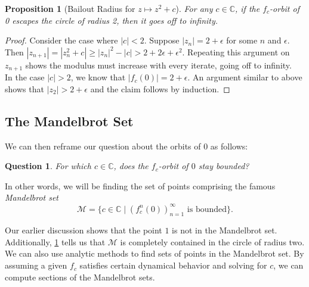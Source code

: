 \documentclass{amsart}
\newcommand{\bbC}{\mathbb{C}}
\newcommand{\cal}[1]{ \mathcal{#1}}
\newcommand{\Mand}{\cal{M}}
\newcommand{\abs}[1]{ \left| #1 \right| }
\newtheorem{prop}[thm]{Proposition}
\newtheorem{quest}[thm]{Question}
\theoremstyle{definition}
\theoremstyle{remark}
\numberwithin{equation}{section}
\begin{document}
\begin{prop}[Bailout Radius for $z\mapsto z^2+c$]\label{Mescape}
  For any $c\in\bbC$, if the $f_c$-orbit of 0 escapes the circle of radius 2, then it goes off to infinity.
\end{prop}
\begin{proof}
Consider the case where $\abs{c}<2$. Suppose $\abs{z_n}=2+\epsilon$ for some $n$ and $\epsilon$. Then $\abs{z_{n+1}}= \abs{z_n^2+c}\geq \abs{z_n}^2-\abs{c}>2+2\epsilon+\epsilon^2$. Repeating this argument on $z_{n+1}$ shows the modulus must increase with every iterate, going off to infinity.\\

In the case $\abs{c}>2$, we know that $\abs{f_c(0)}=2+\epsilon$. An argument similar to above shows that $\abs{z_2}>2+\epsilon$ and the claim follows by induction.
\end{proof}

\subsection{The Mandelbrot Set}

  We can then reframe our question about the orbits of 0 as follows:

  \begin{quest}
    For which $c\in\bbC$, does the $f_c$-orbit of $0$ stay bounded?
  \end{quest}

In other words, we will be finding the set of points comprising the famous \emph{Mandelbrot set}
\begin{equation}
  \Mand=\{c\in\bbC \mid (f_c^n(0))_{n=1}^{\infty} \text{ is bounded} \}.
\end{equation}

Our earlier discussion shows that the point $1$ is not in the Mandelbrot set. Additionally, \cref{Mescape} tells us that $\Mand$ is completely contained in the circle of radius two. We can also use analytic methods to find sets of points in the Mandelbrot set. By assuming a given $f_c$ satisfies certain dynamical behavior and solving for $c$, we can compute sections of the Mandelbrot sets.
\end{document}
